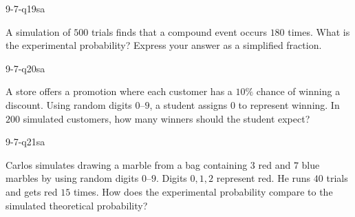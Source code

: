 \begin{practiceQuestion}{9-7-q19}{sa}
\begin{questionText}
A simulation of $500$ trials finds that a compound event occurs $180$ times. What is the experimental probability? Express your answer as a simplified fraction.
\end{questionText}
\end{practiceQuestion}

\begin{practiceQuestion}{9-7-q20}{sa}
\begin{questionText}
A store offers a promotion where each customer has a $10\%$ chance of winning a discount. Using random digits $0$--$9$, a student assigns $0$ to represent winning. In $200$ simulated customers, how many winners should the student expect?
\end{questionText}
\end{practiceQuestion}

\begin{practiceQuestion}{9-7-q21}{sa}
\begin{questionText}
Carlos simulates drawing a marble from a bag containing $3$ red and $7$ blue marbles by using random digits $0$--$9$. Digits $0, 1, 2$ represent red. He runs $40$ trials and gets red $15$ times. How does the experimental probability compare to the simulated theoretical probability?
\end{questionText}
\end{practiceQuestion}


